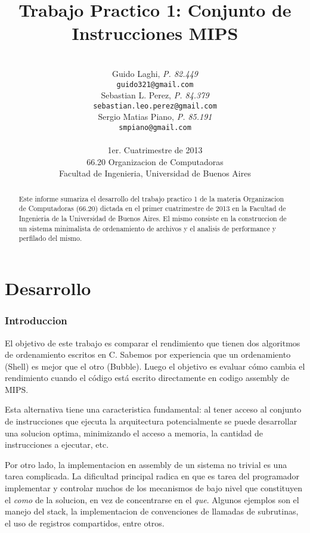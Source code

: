 \documentclass[a4paper,11pt]{article}
\title{\textbf{Trabajo Practico 1: Conjunto de Instrucciones MIPS}}
\author{\\
  Guido Laghi, \textit{P. 82.449}                                  \\
  \texttt{guido321@gmail.com}                                      \\ [2.5ex]
  Sebastian L. Perez, \textit{P. 84.379}                           \\
  \texttt{sebastian.leo.perez@gmail.com}                           \\ [2.5ex]
  Sergio Matias Piano, \textit{P. 85.191}                          \\
  \texttt{smpiano@gmail.com}                                       \\ [2.5ex]
                                                                   \\
  \normalsize{1er. Cuatrimestre de 2013}                           \\
  \normalsize{66.20 Organizacion de Computadoras}                  \\
  \normalsize{Facultad de Ingenieria, Universidad de Buenos Aires} \\
}
\date{}
\begin{document}
\thispagestyle{empty}
\maketitle

\begin{abstract}

  Este informe sumariza el desarrollo del trabajo practico 1 de la materia
  Organizacion de Computadoras (66.20) dictada en el primer cuatrimestre de
  2013 en la Facultad de Ingenieria de la Universidad de Buenos Aires. El mismo
  consiste en la construccion de un sistema minimalista de ordenamiento de
  archivos y el analisis de performance y perfilado del mismo.

\end{abstract}

\clearpage

\tableofcontents
\clearpage


\part{Desarrollo}

\section{Introduccion}

El objetivo de este trabajo es comparar el rendimiento que tienen dos algoritmos de ordenamiento escritos en C. Sabemos por experiencia que un ordenamiento (Shell) es mejor que el otro (Bubble). Luego el objetivo es evaluar cómo cambia el rendimiento cuando el código está escrito directamente en codigo assembly de MIPS.

Esta alternativa tiene una caracteristica fundamental: al tener
acceso al conjunto de instrucciones que ejecuta la arquitectura potencialmente
se puede desarrollar una solucion optima, minimizando el acceso a memoria, la
cantidad de instrucciones a ejecutar, etc.

Por otro lado, la implementacion en assembly de un sistema no trivial es una
tarea complicada. La dificultad principal radica en que es tarea del
programador implementar y controlar muchos de los mecanismos de bajo nivel que
constituyen el \textit{como} de la solucion, en vez de concentrarse en el
\textit{que}. Algunos ejemplos son el manejo del stack, la implementacion de
convenciones de llamadas de subrutinas, el uso de registros compartidos, entre
otros.
\end{document}
